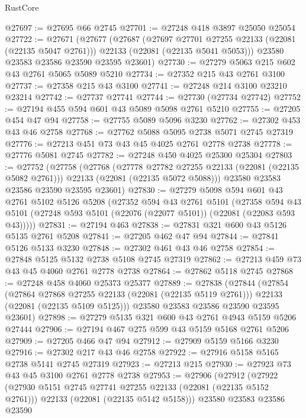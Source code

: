 \begin{lexlean}{RustCore}
\begin{coremodule}
@27697 := @27695 @66 @2745
@27701 := @27248 @418 @3897 @25050 @25054
@27722 := @27671
    (@27677
      (@27687
        (@27697 @27701 @27255 @22133 (@22081 (@22135 @5047 @2761)))
        @22133
        (@22081 (@22135 @5041 @5053)))
      @23580
      @23583
      @23586
      @23590
      @23595
      @23601)
@27730 := @27279 @5063 @215 @602 @43 @2761 @5065 @5089 @5210
@27734 := @27352 @215 @43 @2761 @3100
@27737 := @27358 @215 @43 @3100
@27741 := @27248 @214 @3100 @23210 @23214
@27742 := @27737 @27741
@27744 := @27730 (@27734 @27742)
@27752 := @27194 @455 @594 @601 @43 @5089 @5098 @2761 @5210
@27755 := @27205 @454 @47 @94
@27758 := @27755 @5089 @5096 @3230
@27762 := @27302 @453 @43 @46 @2758
@27768 := @27762 @5088 @5095 @2738 @5071 @2745 @27319
@27776 := @27213 @451 @73 @43 @45 @4025 @2761 @2778 @2738
@27778 := @27776 @5081 @2745
@27782 := @27248 @450 @4025 @25300 @25304
@27803 := @27752
    (@27758
      (@27768
        (@27778 @27782 @27255 @22133 (@22081 (@22135 @5082 @2761)))
        @22133
        (@22081 (@22135 @5072 @5088)))
      @23580
      @23583
      @23586
      @23590
      @23595
      @23601)
@27830 := @27279
    @5098
    @594
    @601
    @43
    @2761
    @5102
    @5126
    @5208
    (@27352
      @594
      @43
      @2761
      @5101
      (@27358
        @594
        @43
        @5101
        (@27248 @593 @5101 (@22076 (@22077 @5101)) (@22081 (@22083 @593 @43)))))
@27831 := @27194 @463
@27838 := @27831 @321 @600 @43 @5126 @5135 @2761 @5208
@27841 := @27205 @462 @47 @94
@27844 := @27841 @5126 @5133 @3230
@27848 := @27302 @461 @43 @46 @2758
@27854 := @27848 @5125 @5132 @2738 @5108 @2745 @27319
@27862 := @27213 @459 @73 @43 @45 @4060 @2761 @2778 @2738
@27864 := @27862 @5118 @2745
@27868 := @27248 @458 @4060 @25373 @25377
@27889 := @27838
    (@27844
      (@27854
        (@27864 @27868 @27255 @22133 (@22081 (@22135 @5119 @2761)))
        @22133
        (@22081 (@22135 @5109 @5125)))
      @23580
      @23583
      @23586
      @23590
      @23595
      @23601)
@27898 := @27279 @5135 @321 @600 @43 @2761 @4943 @5159 @5206 @27444
@27906 := @27194 @467 @275 @599 @43 @5159 @5168 @2761 @5206
@27909 := @27205 @466 @47 @94
@27912 := @27909 @5159 @5166 @3230
@27916 := @27302 @217 @43 @46 @2758
@27922 := @27916 @5158 @5165 @2738 @5141 @2745 @27319
@27923 := @27213 @215
@27930 := @27923 @73 @43 @45 @3100 @2761 @2778 @2738
@27953 := @27906
    (@27912
      (@27922
        (@27930 @5151 @2745 @27741 @27255 @22133 (@22081 (@22135 @5152 @2761)))
        @22133
        (@22081 (@22135 @5142 @5158)))
      @23580
      @23583
      @23586
      @23590

\end{coremodule}
\end{lexlean}
